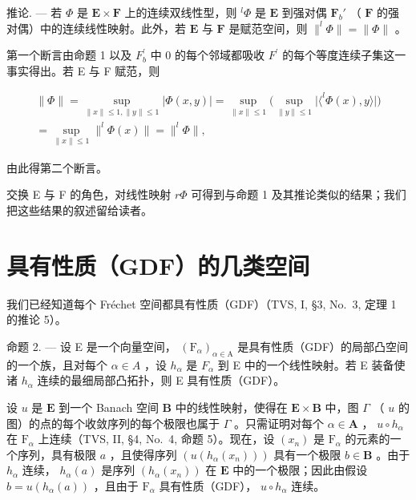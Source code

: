 推论. --- 若 \(\Phi\) 是 \(\mathbf{E} \times \mathbf{F}\) 上的连续双线性型，则 \(^l\Phi\) 是 \(\mathbf{E}\) 到强对偶 \(\mathbf{F}_b'\) （ \(\mathbf{F}\) 的强对偶）中的连续线性映射。此外，若 \(\mathbf{E}\) 与 \(\mathbf{F}\) 是赋范空间，则 \(\|^l\Phi\| = \| \Phi \|\) 。

第一个断言由命题 1 以及 \(F_{b}^{\prime}\) 中 0 的每个邻域都吸收 \(F^{\prime}\) 的每个等度连续子集这一事实得出。若 E 与 F 赋范，则

\[
\begin{array}{c} \| \Phi \| = \sup _ {\| x \| \leqslant 1, \| y \| \leqslant 1} | \Phi (x, y) | = \sup _ {\| x \| \leqslant 1} \Big (\sup _ {\| y \| \leqslant 1} \big | \langle^ {l} \Phi (x), y \rangle \big | \Big) \\ = \sup _ {\| x \| \leqslant 1} \| ^ {l} \Phi (x) \| = \| ^ {l} \Phi \|, \end{array}
\]

由此得第二个断言。

交换 E 与 F 的角色，对线性映射 \(r\Phi\) 可得到与命题 1 及其推论类似的结果；我们把这些结果的叙述留给读者。

\section{具有性质（GDF）的几类空间}

我们已经知道每个 Fréchet 空间都具有性质（GDF）（TVS, I, §3, No.~3, 定理 1 的推论 5）。

命题 2. --- 设 E 是一个向量空间， \((\mathrm{F}_{\alpha})_{\alpha\in\mathrm{A}}\) 是具有性质（GDF）的局部凸空间的一个族，且对每个 \(\alpha\in A\) ，设 \(h_{\alpha}\) 是 \(F_{\alpha}\) 到 E 中的一个线性映射。若 E 装备使诸 \(h_{\alpha}\) 连续的最细局部凸拓扑，则 E 具有性质（GDF）。

设 \(u\) 是 \(\mathbf{E}\) 到一个 Banach 空间 \(\mathbf{B}\) 中的线性映射，使得在 \(\mathbf{E} \times \mathbf{B}\) 中，图 \(\Gamma\) （ \(u\) 的图）的点的每个收敛序列的每个极限也属于 \(\Gamma\) 。只需证明对每个 \(\alpha \in \mathbf{A}\) ， \(u \circ h_{\alpha}\) 在 \(\mathrm{F}_{\alpha}\) 上连续（TVS, II, §4, No.~4, 命题 5）。现在，设 \((x_n)\) 是 \(\mathrm{F}_{\alpha}\) 的元素的一个序列，具有极限 \(a\) ，且使得序列 \(\left(u(h_{\alpha}(x_n))\right)\) 具有一个极限 \(b \in \mathbf{B}\) 。由于 \(h_{\alpha}\) 连续， \(h_{\alpha}(a)\) 是序列 \((h_{\alpha}(x_n))\) 在 \(\mathbf{E}\) 中的一个极限；因此由假设 \(b = u(h_{\alpha}(a))\) ，且由于 \(\mathrm{F}_{\alpha}\) 具有性质（GDF）， \(u \circ h_{\alpha}\) 连续。

